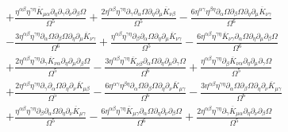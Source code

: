 \documentclass[10pt,letterpaper]{article}
\numberwithin{equation}{section}
\begin{document}
\begin{align}
&+ \frac{\eta^{\alpha \beta} \eta^{\gamma \eta} \overline{K}_{\mu \alpha} \partial_{\eta}\partial_{\gamma}\partial_{\nu}\partial_{\beta}\Omega}{\Omega^5} + \frac{2 \eta^{\alpha \beta} \eta^{\gamma \eta} \partial_{\gamma}\partial_{\alpha}\Omega \partial_{\eta}\partial_{\mu}\overline{K}_{\nu \beta}}{\Omega^5} -  \frac{6 \eta^{\alpha \gamma} \eta^{\beta \eta} \partial_{\alpha}\Omega \partial_{\beta}\Omega \partial_{\eta}\partial_{\mu}\overline{K}_{\nu \gamma}}{\Omega^6} \nonumber \\
&-  \frac{3 \eta^{\alpha \beta} \eta^{\gamma \eta} \partial_{\alpha}\Omega \partial_{\beta}\Omega \partial_{\eta}\partial_{\mu}\overline{K}_{\nu \gamma}}{\Omega^6} + \frac{\eta^{\alpha \beta} \eta^{\gamma \eta} \partial_{\beta}\partial_{\alpha}\Omega \partial_{\eta}\partial_{\mu}\overline{K}_{\nu \gamma}}{\Omega^5} -  \frac{6 \eta^{\alpha \beta} \eta^{\gamma \eta} \overline{K}_{\nu \gamma} \partial_{\alpha}\Omega \partial_{\eta}\partial_{\mu}\partial_{\beta}\Omega}{\Omega^6}\nonumber \\
& + \frac{2 \eta^{\alpha \beta} \eta^{\gamma \eta} \partial_{\gamma}\overline{K}_{\nu \alpha} \partial_{\eta}\partial_{\mu}\partial_{\beta}\Omega}{\Omega^5} -  \frac{3 \eta^{\alpha \beta} \eta^{\gamma \eta} \overline{K}_{\nu \beta} \partial_{\alpha}\Omega \partial_{\eta}\partial_{\mu}\partial_{\gamma}\Omega}{\Omega^6} + \frac{\eta^{\alpha \beta} \eta^{\gamma \eta} \partial_{\beta}\overline{K}_{\nu \alpha} \partial_{\eta}\partial_{\mu}\partial_{\gamma}\Omega}{\Omega^5} \nonumber \\
&+ \frac{2 \eta^{\alpha \beta} \eta^{\gamma \eta} \partial_{\gamma}\partial_{\alpha}\Omega \partial_{\eta}\partial_{\nu}\overline{K}_{\mu \beta}}{\Omega^5} -  \frac{6 \eta^{\alpha \gamma} \eta^{\beta \eta} \partial_{\alpha}\Omega \partial_{\beta}\Omega \partial_{\eta}\partial_{\nu}\overline{K}_{\mu \gamma}}{\Omega^6} -  \frac{3 \eta^{\alpha \beta} \eta^{\gamma \eta} \partial_{\alpha}\Omega \partial_{\beta}\Omega \partial_{\eta}\partial_{\nu}\overline{K}_{\mu \gamma}}{\Omega^6} \nonumber \\
&+ \frac{\eta^{\alpha \beta} \eta^{\gamma \eta} \partial_{\beta}\partial_{\alpha}\Omega \partial_{\eta}\partial_{\nu}\overline{K}_{\mu \gamma}}{\Omega^5} -  \frac{6 \eta^{\alpha \beta} \eta^{\gamma \eta} \overline{K}_{\mu \gamma} \partial_{\alpha}\Omega \partial_{\eta}\partial_{\nu}\partial_{\beta}\Omega}{\Omega^6} + \frac{2 \eta^{\alpha \beta} \eta^{\gamma \eta} \partial_{\gamma}\overline{K}_{\mu \alpha} \partial_{\eta}\partial_{\nu}\partial_{\beta}\Omega}{\Omega^5} \nonumber \\

\end{align}
\end{document}
